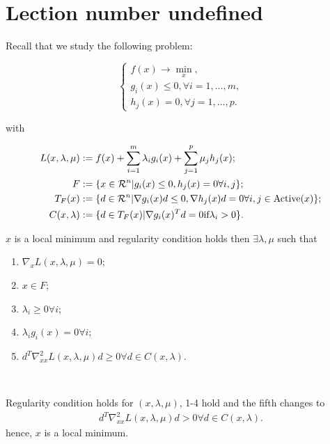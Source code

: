 \section{Lection number undefined}

Recall that we study the following problem: 

\begin{equation*}
    \begin{cases}
        f(x) \to \min_x, \\ 
        g_i(x) \leq 0, \forall i = 1, \ldots, m, \\ 
        h_j(x) = 0, \forall j = 1, \ldots, p.
    \end{cases}
\end{equation*}

with  

\begin{equation*}
    \begin{aligned}
        L (x, \lambda, \mu) &:= f(x) + \sum_{i = 1}^m \lambda_i g_i(x) + \sum_{j = 1}^p \mu_j h_j(x); \\
        F &:=  \{x \in \mathcal{R}^n | g_i(x) \leq 0, h_j(x) = 0 \forall i, j \}; \\ 
        T_F(x) &:= \{d \in \mathcal{R}^n | \nabla g_i(x) d \leq 0, \nabla h_j(x) d = 0 \forall i, j \in \operatorname{Active}(x) \}; \\ 
        C(x, \lambda) &:= \{ d \in T_F(x) | \nabla g_i (x)^T d = 0 \text{if} \lambda_i > 0 \}.
    \end{aligned}
\end{equation*}

\begin{lemma}
    $x$ is a local minimum and regularity condition holds then $\exists \lambda, \mu$ such that 
    \begin{enumerate} 
        \item $\nabla_x L(x, \lambda, \mu) = 0$; 
        \item $x \in F$;
        \item $\lambda_i \geq 0 \forall i$;
        \item $\lambda_i g_i(x) = 0 \forall i$; 
        \item $d^T \nabla^2_{xx} L(x, \lambda, \mu) d \geq 0 \forall d \in C(x, \lambda)$.
    \end{enumerate}
\end{lemma} \ 

\begin{lemma}
    Regularity condition holds for $(x, \lambda, \mu)$, 1-4 hold and the fifth changes to
    \begin{equation*}
        \begin{aligned}
            d^T \nabla^2_{xx} L(x, \lambda, \mu) d > 0 \forall d \in C(x, \lambda).
        \end{aligned}
    \end{equation*}
    hence, $x$ is a local minimum.
\end{lemma} \ 

